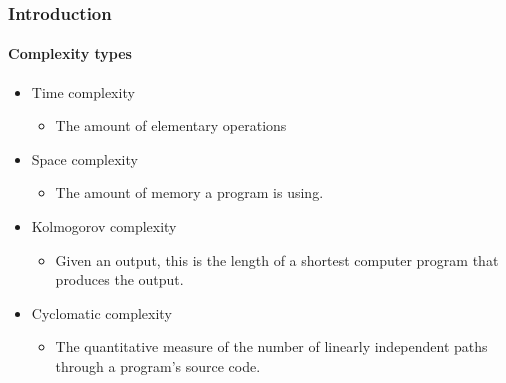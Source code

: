\begin{frame}
  \frametitle{Introduction}
  \framesubtitle{Complexity types}

  \begin{itemize}[<+->]
    \item Time complexity
          \begin{itemize}
            \item The amount of elementary operations
          \end{itemize}
    \item Space complexity
          \begin{itemize}
            \item The amount of memory a program is using.
          \end{itemize}
    \item Kolmogorov complexity
          \begin{itemize}
            \item Given an output, this is the length of a shortest computer
                  program that produces the output.
          \end{itemize}
    \item Cyclomatic complexity
          \begin{itemize}
            \item The quantitative measure of the number of linearly
                  independent paths through a program's source code.
          \end{itemize}
  \end{itemize}


\end{frame}
